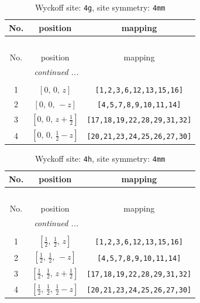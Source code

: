 \documentclass[fleqn,8pt]{jsarticle}
\begin{document}
\renewcommand{\arraystretch}{1.2}
\begin{longtable}{ccc}
\caption{Wyckoff site: {\tt 4g}, site symmetry: {\tt 4mm}}
 \\
 \hline \hline
No. & position & mapping \\ \hline \endfirsthead

\multicolumn{2}{l}{\tablename\ \thetable{}} \\
 \hline \hline
No. & position & mapping \\ \hline \endhead

 \hline \hline
\multicolumn{2}{r}{\footnotesize\it continued ...} \\ \endfoot

 \hline \hline
\multicolumn{2}{r}{} \\ \endlastfoot

1 & $\left[ 0,\, 0,\, z \right]$ & {\tt [1,2,3,6,12,13,15,16]} \\ \hline
2 & $\left[ 0,\, 0,\, - z \right]$ & {\tt [4,5,7,8,9,10,11,14]} \\ \hline
3 & $\left[ 0,\, 0,\, z + \frac{1}{2} \right]$ & {\tt [17,18,19,22,28,29,31,32]} \\ \hline
4 & $\left[ 0,\, 0,\, \frac{1}{2} - z \right]$ & {\tt [20,21,23,24,25,26,27,30]} \\
\end{longtable}
\renewcommand{\arraystretch}{1.2}
\begin{longtable}{ccc}
\caption{Wyckoff site: {\tt 4h}, site symmetry: {\tt 4mm}}
 \\
 \hline \hline
No. & position & mapping \\ \hline \endfirsthead

\multicolumn{2}{l}{\tablename\ \thetable{}} \\
 \hline \hline
No. & position & mapping \\ \hline \endhead

 \hline \hline
\multicolumn{2}{r}{\footnotesize\it continued ...} \\ \endfoot

 \hline \hline
\multicolumn{2}{r}{} \\ \endlastfoot

1 & $\left[ \frac{1}{2},\, \frac{1}{2},\, z \right]$ & {\tt [1,2,3,6,12,13,15,16]} \\ \hline
2 & $\left[ \frac{1}{2},\, \frac{1}{2},\, - z \right]$ & {\tt [4,5,7,8,9,10,11,14]} \\ \hline
3 & $\left[ \frac{1}{2},\, \frac{1}{2},\, z + \frac{1}{2} \right]$ & {\tt [17,18,19,22,28,29,31,32]} \\ \hline
4 & $\left[ \frac{1}{2},\, \frac{1}{2},\, \frac{1}{2} - z \right]$ & {\tt [20,21,23,24,25,26,27,30]} \\
\end{longtable}
\end{document}
